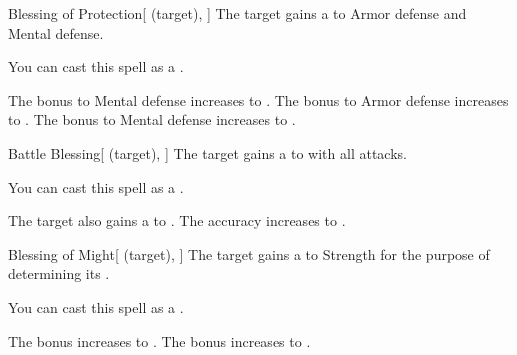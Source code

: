 \lowercase{\hypertarget{spell:Blessing of Protection}{}}\label{spell:Blessing of Protection}
\begin{attuneability}[Rank 1]{\hypertarget{spell:Blessing of Protection}{Blessing of Protection}}[ (target), ]
The target gains a   to Armor defense and Mental defense.

You can cast this spell as a .

\rankline
{} The bonus to Mental defense increases to .
 The bonus to Armor defense increases to .
 The bonus to Mental defense increases to .
\end{attuneability}
\vspace{0.25em}



\lowercase{\hypertarget{spell:Battle Blessing}{}}\label{spell:Battle Blessing}
\begin{attuneability}[Rank 3]{\hypertarget{spell:Battle Blessing}{Battle Blessing}}[ (target), ]
The target gains a   to  with all attacks.

You can cast this spell as a .

\rankline
{} The target also gains a   to .
 The accuracy increases to .
\end{attuneability}
\vspace{0.25em}



\lowercase{\hypertarget{spell:Blessing of Might}{}}\label{spell:Blessing of Might}
\begin{attuneability}[Rank 3]{\hypertarget{spell:Blessing of Might}{Blessing of Might}}[ (target), ]
The target gains a   to Strength for the purpose of determining its .

You can cast this spell as a .

\rankline
{} The bonus increases to .
 The bonus increases to .
\end{attuneability}
\vspace{0.25em}



